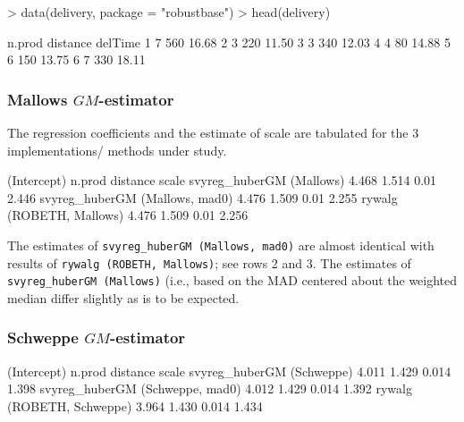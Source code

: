 \documentclass[a4paper,oneside,11pt,DIV=12]{scrartcl}
\newcommand{\code}[1]{{\texttt{#1}}}
\begin{document}
\begin{Schunk}
\begin{Sinput}
> data(delivery, package = "robustbase")
> head(delivery)
\end{Sinput}
\begin{Soutput}
  n.prod distance delTime
1      7      560   16.68
2      3      220   11.50
3      3      340   12.03
4      4       80   14.88
5      6      150   13.75
6      7      330   18.11
\end{Soutput}
\end{Schunk}

\subsubsection{Mallows $GM$-estimator}\label{sec:delivery_mallows}
\noindent The regression coefficients and the estimate of scale are
tabulated for the 3 implementations/ methods under study.

\begin{Schunk}
\begin{Soutput}
                               (Intercept) n.prod distance scale
svyreg_huberGM (Mallows)             4.468  1.514     0.01 2.446
svyreg_huberGM (Mallows, mad0)       4.476  1.509     0.01 2.255
rywalg (ROBETH, Mallows)             4.476  1.509     0.01 2.256
\end{Soutput}
\end{Schunk}

\noindent The estimates of \code{svyreg\_huberGM (Mallows, mad0)} are
almost identical with results of \code{rywalg (ROBETH, Mallows)}; see
rows 2 and 3. The estimates of \code{svyreg\_huberGM (Mallows)} (i.e.,
based on the MAD centered about the weighted median differ slightly
as is to be expected.

\subsubsection{Schweppe $GM$-estimator}\label{sec:delivery_schweppe}

\begin{Schunk}
\begin{Soutput}
                                (Intercept) n.prod distance scale
svyreg_huberGM (Schweppe)             4.011  1.429    0.014 1.398
svyreg_huberGM (Schweppe, mad0)       4.012  1.429    0.014 1.392
rywalg (ROBETH, Schweppe)             3.964  1.430    0.014 1.434
\end{Soutput}
\end{Schunk}
\end{document}
